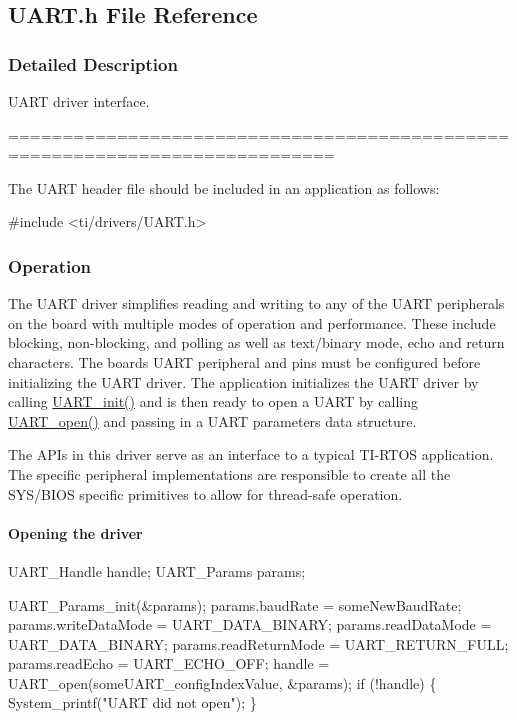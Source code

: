 \subsection{U\+A\+R\+T.\+h File Reference}
\label{_u_a_r_t_8h}


\subsubsection{Detailed Description}
U\+A\+R\+T driver interface. 

============================================================================

The U\+A\+R\+T header file should be included in an application as follows\+: 
\begin{DoxyCode}
\textcolor{preprocessor}{#include <ti/drivers/UART.h>}
\end{DoxyCode}


\subsubsection*{Operation}

The U\+A\+R\+T driver simplifies reading and writing to any of the U\+A\+R\+T peripherals on the board with multiple modes of operation and performance. These include blocking, non-\/blocking, and polling as well as text/binary mode, echo and return characters. The boards U\+A\+R\+T peripheral and pins must be configured before initializing the U\+A\+R\+T driver. The application initializes the U\+A\+R\+T driver by calling \hyperlink{_u_a_r_t_8h_ab60a36f7295d704926120d22f806dcd1}{U\+A\+R\+T\+\_\+init()} and is then ready to open a U\+A\+R\+T by calling \hyperlink{_u_a_r_t_8h_a0442ea1ec23901168da31726bb3254c1}{U\+A\+R\+T\+\_\+open()} and passing in a U\+A\+R\+T parameters data structure.

The A\+P\+Is in this driver serve as an interface to a typical T\+I-\/\+R\+T\+O\+S application. The specific peripheral implementations are responsible to create all the S\+Y\+S/\+B\+I\+O\+S specific primitives to allow for thread-\/safe operation.

\paragraph*{Opening the driver}


\begin{DoxyCode}
UART_Handle      handle;
UART_Params      params;

UART_Params_init(&params);
params.baudRate  = someNewBaudRate;
params.writeDataMode = UART_DATA_BINARY;
params.readDataMode = UART_DATA_BINARY;
params.readReturnMode = UART_RETURN_FULL;
params.readEcho = UART_ECHO_OFF;
handle = UART_open(someUART\_configIndexValue, &params);
\textcolor{keywordflow}{if} (!handle) \{
    System\_printf(\textcolor{stringliteral}{"UART did not open"});
\}
\end{DoxyCode}



